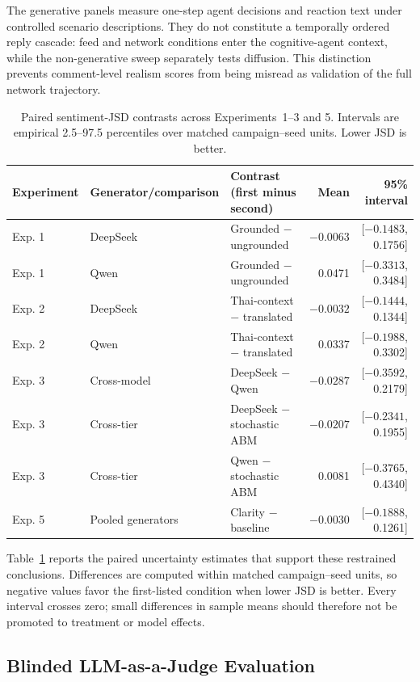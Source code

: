 \documentclass[conference]{IEEEtran}
\begin{document}
The generative panels measure one-step agent decisions and reaction text under
controlled scenario descriptions. They do not constitute a temporally ordered
reply cascade: feed and network conditions enter the cognitive-agent context,
while the non-generative sweep separately tests diffusion. This distinction
prevents comment-level realism scores from being misread as validation of the
full network trajectory.

\begin{table}[!t]
\caption{Paired sentiment-JSD contrasts across Experiments~1--3 and 5.
Intervals are empirical 2.5--97.5 percentiles over matched campaign--seed
units. Lower JSD is better.}
\label{tab:paired-contrasts}
\centering
\footnotesize
\begin{tabular}{@{}lllrr@{}}
\toprule
Experiment & Generator/comparison & Contrast (first minus second) & Mean & 95\% interval \\
\midrule
Exp. 1 & DeepSeek & Grounded $-$ ungrounded & $-0.0063$ & [$-0.1483$, 0.1756] \\
Exp. 1 & Qwen & Grounded $-$ ungrounded & 0.0471 & [$-0.3313$, 0.3484] \\
Exp. 2 & DeepSeek & Thai-context $-$ translated & $-0.0032$ & [$-0.1444$, 0.1344] \\
Exp. 2 & Qwen & Thai-context $-$ translated & 0.0337 & [$-0.1988$, 0.3302] \\
Exp. 3 & Cross-model & DeepSeek $-$ Qwen & $-0.0287$ & [$-0.3592$, 0.2179] \\
Exp. 3 & Cross-tier & DeepSeek $-$ stochastic ABM & $-0.0207$ & [$-0.2341$, 0.1955] \\
Exp. 3 & Cross-tier & Qwen $-$ stochastic ABM & 0.0081 & [$-0.3765$, 0.4340] \\
Exp. 5 & Pooled generators & Clarity $-$ baseline & $-0.0030$ & [$-0.1888$, 0.1261] \\
\bottomrule
\end{tabular}
\end{table}

Table~\ref{tab:paired-contrasts} reports the paired uncertainty estimates that
support these restrained conclusions. Differences are computed within matched
campaign--seed units, so negative values favor the first-listed condition when
lower JSD is better. Every interval crosses zero; small differences in sample
means should therefore not be promoted to treatment or model effects.

\subsection{Blinded LLM-as-a-Judge Evaluation}
\end{document}
